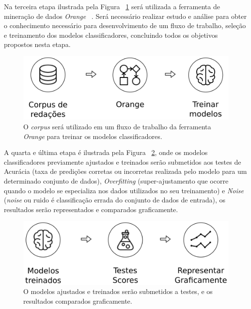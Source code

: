 Na terceira etapa ilustrada pela Figura ~\ref{fig:metodologia_3} será utilizada a ferramenta de mineração de dados \textit{Orange} ~\cite{JMLR:demsar13a}. Será necessário realizar estudo e análise para obter o conhecimento necessário para desenvolvimento de um fluxo de trabalho, seleção e treinamento dos modelos classificadores, concluindo todos os objetivos propostos nesta etapa.

\begin{figure}[H]
\begin{center}
    \includegraphics[scale=0.75]{figuras/metodologia_3.png}
\end{center}
\caption{O \textit{corpus} será utilizado em um fluxo de trabalho da ferramenta \textit{Orange} para treinar os modelos classificadores.}
\label{fig:metodologia_3}
\end{figure}

A quarta e última etapa é ilustrada pela Figura ~\ref{fig:metodologia_4}, onde os modelos classificadores previamente ajustados e treinados serão submetidos aos testes de Acurácia (taxa de predições corretas ou incorretas realizada pelo modelo para um determinado conjunto de dados), \textit{Overfitting} (super-ajustamento que ocorre quando o modelo se especializa nos dados utilizados no seu treinamento) e \textit{Noise} (\textit{noise} ou ruido é classificação errada do conjunto de dados de entrada), os resultados serão representados e comparados graficamente.
\begin{figure}[H]
\begin{center}
    \includegraphics[scale=0.75]{figuras/metodologia_4.png}
\end{center}
\caption{O modelos ajustados e treinados serão submetidos a testes, e os resultados comparados graficamente.}
\label{fig:metodologia_4}
\end{figure}
